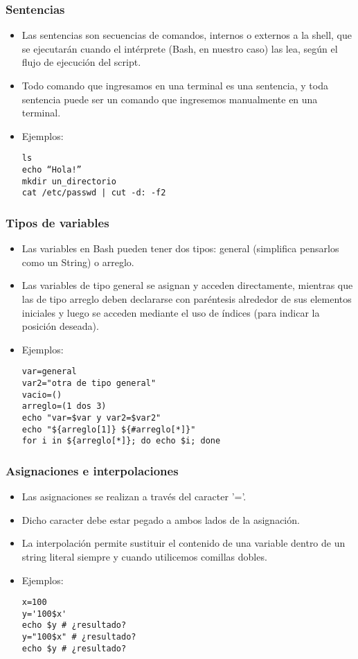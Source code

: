\begin{frame}[fragile]
  \frametitle{Sentencias}
  \begin{itemize}
	  \item Las sentencias son secuencias de comandos, internos o externos a la shell, que se ejecutarán cuando el intérprete (Bash, en nuestro caso) las lea, según el flujo de ejecución del script.
	  \item Todo comando que ingresamos en una terminal es una sentencia, y toda sentencia puede ser un comando que ingresemos manualmente en una terminal.
    \item Ejemplos:
		\begin{lstlisting}
ls
echo “Hola!”
mkdir un_directorio
cat /etc/passwd | cut -d: -f2
		\end{lstlisting}
  \end{itemize}
\end{frame}

\begin{frame}[fragile]
  \frametitle{Tipos de variables}
  \begin{itemize}
	  \item Las variables en Bash pueden tener dos tipos: general (simplifica pensarlos como un String) o arreglo.
	  \item Las variables de tipo general se asignan y acceden directamente, mientras que las de tipo arreglo deben declararse con paréntesis alrededor de sus elementos iniciales y luego se acceden mediante el uso de índices (para indicar la posición deseada).
    \item Ejemplos:
		\begin{lstlisting}
var=general
var2="otra de tipo general"
vacio=()
arreglo=(1 dos 3)
echo "var=$var y var2=$var2"
echo "${arreglo[1]} ${#arreglo[*]}"
for i in ${arreglo[*]}; do echo $i; done
		\end{lstlisting}
  \end{itemize}
\end{frame}

\begin{frame}[fragile]
  \frametitle{Asignaciones e interpolaciones}
  \begin{itemize}
	  \item Las asignaciones se realizan a través del caracter '='.
	  \item Dicho caracter debe estar pegado a ambos lados de la asignación.
    \item La interpolación permite sustituir el contenido de una variable dentro de un string literal siempre y cuando utilicemos comillas dobles.
    \item Ejemplos:
		\begin{lstlisting}
x=100
y='100$x'
echo $y # ¿resultado?
y="100$x" # ¿resultado?
echo $y # ¿resultado?
		\end{lstlisting}
  \end{itemize}
\end{frame}

